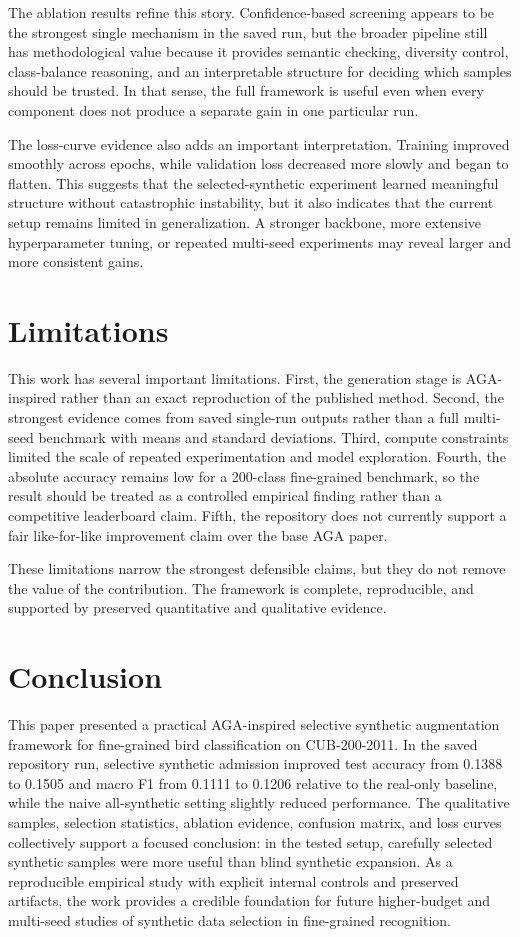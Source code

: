 \documentclass[conference]{IEEEtran}
\begin{document}
The ablation results refine this story. Confidence-based screening appears to be the strongest single mechanism in the saved run, but the broader pipeline still has methodological value because it provides semantic checking, diversity control, class-balance reasoning, and an interpretable structure for deciding which samples should be trusted. In that sense, the full framework is useful even when every component does not produce a separate gain in one particular run.

The loss-curve evidence also adds an important interpretation. Training improved smoothly across epochs, while validation loss decreased more slowly and began to flatten. This suggests that the selected-synthetic experiment learned meaningful structure without catastrophic instability, but it also indicates that the current setup remains limited in generalization. A stronger backbone, more extensive hyperparameter tuning, or repeated multi-seed experiments may reveal larger and more consistent gains.

\section{Limitations}
This work has several important limitations. First, the generation stage is AGA-inspired rather than an exact reproduction of the published method. Second, the strongest evidence comes from saved single-run outputs rather than a full multi-seed benchmark with means and standard deviations. Third, compute constraints limited the scale of repeated experimentation and model exploration. Fourth, the absolute accuracy remains low for a 200-class fine-grained benchmark, so the result should be treated as a controlled empirical finding rather than a competitive leaderboard claim. Fifth, the repository does not currently support a fair like-for-like improvement claim over the base AGA paper.

These limitations narrow the strongest defensible claims, but they do not remove the value of the contribution. The framework is complete, reproducible, and supported by preserved quantitative and qualitative evidence.

\section{Conclusion}
This paper presented a practical AGA-inspired selective synthetic augmentation framework for fine-grained bird classification on CUB-200-2011. In the saved repository run, selective synthetic admission improved test accuracy from 0.1388 to 0.1505 and macro F1 from 0.1111 to 0.1206 relative to the real-only baseline, while the naive all-synthetic setting slightly reduced performance. The qualitative samples, selection statistics, ablation evidence, confusion matrix, and loss curves collectively support a focused conclusion: in the tested setup, carefully selected synthetic samples were more useful than blind synthetic expansion. As a reproducible empirical study with explicit internal controls and preserved artifacts, the work provides a credible foundation for future higher-budget and multi-seed studies of synthetic data selection in fine-grained recognition.
\end{document}
